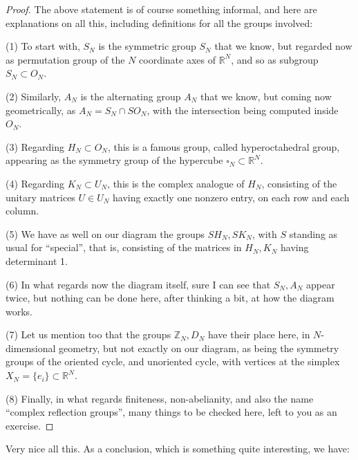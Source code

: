 \documentclass[12pt]{amsbook}
\begin{document}
\begin{proof}
The above statement is of course something informal, and here are explanations on all this, including definitions for all the groups involved:

\medskip

(1) To start with, $S_N$ is the symmetric group $S_N$ that we know, but regarded now as permutation group of the $N$ coordinate axes of $\mathbb R^N$, and so as subgroup $S_N\subset O_N$.

\medskip

(2) Similarly, $A_N$ is the alternating group $A_N$ that we know, but coming now geometrically, as $A_N=S_N\cap SO_N$, with the intersection being computed inside $O_N$. 

\medskip

(3) Regarding $H_N\subset O_N$, this is a famous group, called hyperoctahedral group, appearing as the symmetry group of the hypercube $\square_N\subset\mathbb R^N$.

\medskip

(4) Regarding $K_N\subset U_N$, this is the complex analogue of $H_N$, consisting of the unitary matrices $U\in U_N$ having exactly one nonzero entry, on each row and each column.

\medskip

(5) We have as well on our diagram the groups $SH_N,SK_N$, with $S$ standing as usual for ``special'', that is, consisting of the matrices in  $H_N,K_N$ having determinant 1.

\medskip

(6) In what regards now the diagram itself, sure I can see that $S_N,A_N$ appear twice, but nothing can be done here, after thinking a bit, at how the diagram works.

\medskip

(7) Let us mention too that the groups $\mathbb Z_N,D_N$ have their place here, in $N$-dimensional geometry, but not exactly on our diagram, as being the symmetry groups of the oriented cycle, and unoriented cycle, with vertices at the simplex $X_N=\{e_i\}\subset\mathbb R^N$.

\medskip

(8) Finally, in what regards finiteness, non-abelianity, and also the name ``complex reflection groups'', many things to be checked here, left to you as an exercise.
\end{proof}

Very nice all this. As a conclusion, which is something quite interesting, we have:
\end{document}
